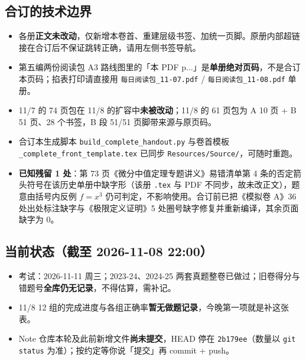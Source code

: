 \documentclass[11pt,a4paper]{ctexart}
\begin{document}
\subsection{合订的技术边界}
\begin{itemize}
\item 各册\textbf{正文未改动}，仅新增本卷首、重建层级书签、加统一页脚。原册内部超链接在合订后不保证跳转正确，请用左侧书签导航。
\item 第五编两份阅读包 A3 路线图里的「本 PDF p$\dots$」是\textbf{单册绝对页码}，不是合订本页码；掐表打印请直接用 \texttt{每日阅读包\_11-07.pdf} / \texttt{每日阅读包\_11-08.pdf} 单册。
\item 11/7 的 74 页包在 11/8 的扩容中\textbf{未被改动}；11/8 的 61 页包为 A 10 页 + B 51 页、28 个书签，B 段 51/51 页脚带来源与原页码。
\item 合订本生成脚本 \texttt{build\_complete\_handout.py} 与卷首模板 \texttt{\_complete\_front\_template.tex} 已同步 \texttt{Resources/Source/}，可随时重跑。
\item \textbf{已知残留 1 处}：第 73 页《微分中值定理专题讲义》易错清单第 4 条的否定箭头符号在该历史单册中缺字形（该册 \texttt{.tex} 与 PDF 不同步，故未改正文），题意由括号内反例 $f=x^3$ 仍可判定，不影响使用。合订前已把《模拟卷 A》36 处出处标注缺字与《极限定义证明》5 处圈号缺字修复并重新编译，其余页面缺字为 0。
\end{itemize}

\subsection{当前状态（截至 2026-11-08 22:00）}
\begin{itemize}
\item 考试：2026-11-11 周三；2023-24、2024-25 两套真题整卷已做过；旧卷得分与错题号\textbf{全库仍无记录}，不得估算，需补记。
\item 11/8 12 组的完成进度与各组正确率\textbf{暂无做题记录}，今晚第一项就是补这张表。
\item Note 仓库本轮及此前新增文件\textbf{尚未提交}，HEAD 停在 \texttt{2b179ee}（数量以 \texttt{git status} 为准）；按约定等你说「提交」再 commit + push。
\end{itemize}
\end{document}
